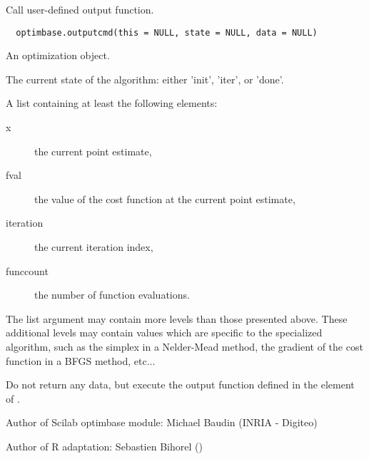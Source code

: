 %
\begin{Description}\relax
Call user-defined output function.
\end{Description}
%
\begin{Usage}
\begin{verbatim}
  optimbase.outputcmd(this = NULL, state = NULL, data = NULL)
\end{verbatim}
\end{Usage}
%
\begin{Arguments}
\begin{ldescription}
\item[\code{this}] An optimization object.
\item[\code{state}] The current state of the algorithm: either 'init', 'iter', or
'done'.
\item[\code{data}] A list containing at least the following elements:
\begin{description}

\item[x] the current point estimate,
\item[fval] the value of the cost function at the current point
estimate,
\item[iteration] the current iteration index,
\item[funccount] the number of function evaluations.

\end{description}


\end{ldescription}
\end{Arguments}
%
\begin{Details}\relax
The  list argument may contain more levels than those presented
above. These additional levels may contain values which are specific to the
specialized algorithm, such as the simplex in a Nelder-Mead method, the
gradient of the cost function in a BFGS method, etc...
\end{Details}
%
\begin{Value}
Do not return any data, but execute the output function defined in the
 element of .
\end{Value}
%
\begin{Author}\relax
Author of Scilab optimbase module: Michael Baudin (INRIA - Digiteo)

Author of R adaptation: Sebastien Bihorel ()
\end{Author}
